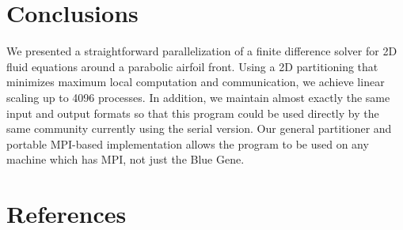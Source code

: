 \documentclass[twocolumn]{article}
\begin{document}
\section{Conclusions}

We presented a straightforward parallelization of a finite difference
solver for 2D fluid equations around a parabolic airfoil front.
Using a 2D partitioning that minimizes maximum local computation
and communication, we achieve linear scaling up to 4096 processes.
In addition, we maintain almost exactly the same input and output
formats so that this program could be used directly by the same
community currently using the serial version.
Our general partitioner and portable MPI-based implementation allows the program
to be used on any machine which has MPI, not just the Blue Gene.

\section{References}
\end{document}
